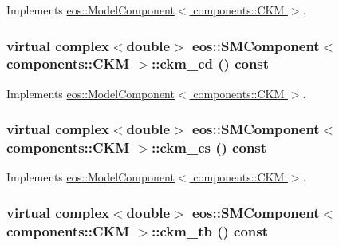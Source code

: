 Implements \hyperlink{classeos_1_1ModelComponent_3_01components_1_1CKM_01_4_aacb78ba3cf4df16bff0c6b6289b1a955}{eos::ModelComponent$<$ components::CKM $>$}.\hypertarget{classeos_1_1SMComponent_3_01components_1_1CKM_01_4_a9ed875717a5f63d01efb163f951f5149}{
\subsubsection[{ckm\_\-cd}]{\setlength{\rightskip}{0pt plus 5cm}virtual complex$<$double$>$ eos::SMComponent$<$ components::CKM $>$::ckm\_\-cd () const}}
\label{classeos_1_1SMComponent_3_01components_1_1CKM_01_4_a9ed875717a5f63d01efb163f951f5149}


Implements \hyperlink{classeos_1_1ModelComponent_3_01components_1_1CKM_01_4_a91f57e4ea6a4072d25e533a424cb0373}{eos::ModelComponent$<$ components::CKM $>$}.\hypertarget{classeos_1_1SMComponent_3_01components_1_1CKM_01_4_a6bea3d64797260948d80302c11b5a6c1}{
\subsubsection[{ckm\_\-cs}]{\setlength{\rightskip}{0pt plus 5cm}virtual complex$<$double$>$ eos::SMComponent$<$ components::CKM $>$::ckm\_\-cs () const}}
\label{classeos_1_1SMComponent_3_01components_1_1CKM_01_4_a6bea3d64797260948d80302c11b5a6c1}


Implements \hyperlink{classeos_1_1ModelComponent_3_01components_1_1CKM_01_4_a9d537c64b4c3379d4a7ebd8ccc815a7e}{eos::ModelComponent$<$ components::CKM $>$}.\hypertarget{classeos_1_1SMComponent_3_01components_1_1CKM_01_4_afb95652fde6ce0bdd7a3b67db4b4ecf4}{
\subsubsection[{ckm\_\-tb}]{\setlength{\rightskip}{0pt plus 5cm}virtual complex$<$double$>$ eos::SMComponent$<$ components::CKM $>$::ckm\_\-tb () const}}
\label{classeos_1_1SMComponent_3_01components_1_1CKM_01_4_afb95652fde6ce0bdd7a3b67db4b4ecf4}



